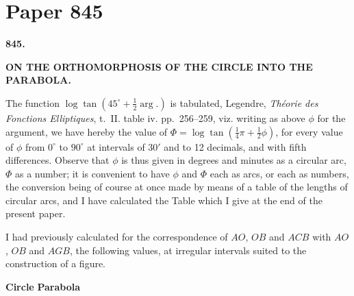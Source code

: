 \documentclass[11pt,a4paper]{book}
\begin{document}
\thispagestyle{empty}


\newpage

\section{Paper 845}

\begin{center}
\large\textbf{845.}

\Large\textbf{ON THE ORTHOMORPHOSIS OF THE CIRCLE INTO THE PARABOLA.}

\end{center}

\bigskip

The function $\log \tan(45^\circ + \frac{1}{2}\arg.)$ is tabulated, Legendre, \textit{Th\'{e}orie des Fonctions Elliptiques}, t.~II. table iv. pp.~256--259, viz. writing as above $\phi$ for the argument, we have hereby the value of $\Phi = \log \tan(\frac{1}{4}\pi + \frac{1}{2}\phi)$, for every value of $\phi$ from $0^\circ$ to $90^\circ$ at intervals of $30'$ and to 12 decimals, and with fifth differences. Observe that $\phi$ is thus given in degrees and minutes as a circular arc, $\Phi$ as a number; it is convenient to have $\phi$ and $\Phi$ each as arcs, or each as numbers, the conversion being of course at once made by means of a table of the lengths of circular arcs, and I have calculated the Table which I give at the end of the present paper.

I had previously calculated for the correspondence of $AO$, $OB$ and $ACB$ with $AO$, $OB$ and $AGB$, the following values, at irregular intervals suited to the construction of a figure.

\bigskip

\textbf{Circle} \hfill \textbf{Parabola}

\medskip
\end{document}
